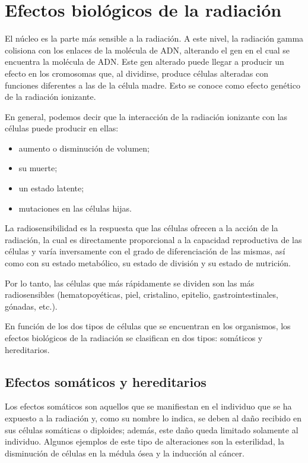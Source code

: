\chapter{Efectos biológicos de la radiación}

El núcleo es la parte más sensible a la radiación. A este nivel, la radiación gamma colisiona con los enlaces de la molécula de ADN, alterando el gen en el cual se encuentra la molécula de ADN. Este gen alterado puede llegar a producir un efecto en los cromosomas que, al dividirse, produce células alteradas con funciones diferentes a las de la célula madre. Esto se conoce como efecto genético de la radiación ionizante.

En general, podemos decir que la interacción de la radiación ionizante con las células puede producir en ellas:
\begin{itemize}
  \item aumento o disminución de volumen;
  \item su muerte;
  \item un estado latente;
  \item mutaciones en las células hijas.
\end{itemize}

La radiosensibilidad es la respuesta que las células ofrecen a la acción de la radiación, la cual es directamente proporcional a la capacidad reproductiva de las células y varía inversamente con el grado de diferenciación de las mismas, así como con su estado metabólico, su estado de división y su estado de nutrición.

Por lo tanto, las células que más rápidamente se dividen son las más radiosensibles (hematopoyéticas, piel, cristalino, epitelio, gastrointestinales, gónadas, etc.).

En función de los dos tipos de células que se encuentran en los organismos, los efectos biológicos de la radiación se clasifican en dos tipos: somáticos y hereditarios.

\section{Efectos somáticos y hereditarios}

Los efectos somáticos son aquellos que se manifiestan en el individuo que se ha expuesto a la radiación y, como su nombre lo indica, se deben al daño recibido en sus células somáticas o diploides; además, este daño queda limitado solamente al individuo. Algunos ejemplos de este tipo de alteraciones son la esterilidad, la disminución de células en la médula ósea y la inducción al cáncer.

